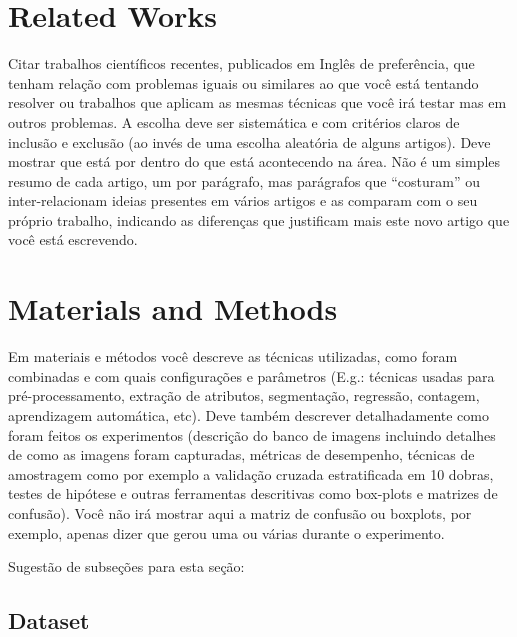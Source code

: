 \documentclass[preprint,10pt,5p]{elsarticle}
\begin{document}
    



\section{Related Works}
\label{works}

Citar trabalhos científicos recentes, publicados em In\-glês de preferência, que tenham relação com problemas iguais ou similares ao que você está tentando resolver ou trabalhos que aplicam as mesmas técnicas que você irá testar mas em outros problemas. A escolha deve ser sistemática e com critérios claros de inclusão e exclusão (ao invés de uma escolha aleatória de alguns artigos). Deve mostrar que está por dentro do que está acontecendo na área. Não é um simples resumo de cada artigo, um por parágrafo, mas parágrafos que ``costuram'' ou inter-relacio\-nam ideias presentes em vários artigos e as comparam com o seu próprio trabalho, indicando as diferenças que justificam mais este novo artigo que você está escrevendo. 





\section{Materials and Methods}
\label{methods}

Em materiais e métodos você descreve as técnicas utilizadas, como foram combinadas e com quais configurações e parâmetros (E.g.: técnicas usadas para pré-processamento, extração de atributos, segmentação, regressão, contagem, aprendizagem automática, etc). Deve também descrever detalhadamente como foram feitos os experimentos (descrição do banco de imagens incluindo detalhes de como as imagens foram capturadas, métricas de desempenho, técnicas de amostragem como por exemplo a validação cruzada estratificada em 10 dobras, testes de hipótese e outras ferramentas descritivas como box-plots e matrizes de confusão). Você não irá mostrar aqui a matriz de confusão ou boxplots, por exemplo, apenas dizer que gerou uma ou várias durante o experimento. 

Sugestão de subseções para esta seção:

\subsection{Dataset}
\end{document}
